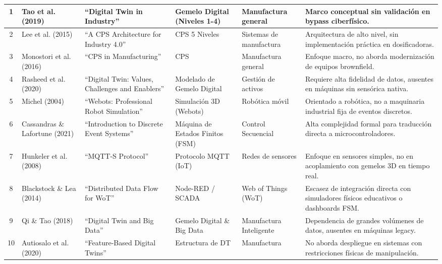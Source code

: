 {\begin{longtable}{|c|p{1.5cm}|p{3.2cm}|p{2.5cm}|p{2cm}|p{3cm}|}
1 & Tao et al. (2019) & ``Digital Twin in Industry'' \cite{tao2019} & Gemelo Digital (Niveles 1-4) & Manufactura general & Marco conceptual sin validación en bypass ciberfísico. \\ 
\hline
2 & Lee et al. (2015) & ``A CPS Architecture for Industry 4.0'' \cite{lee2015} & CPS 5 Niveles & Sistemas de manufactura & Arquitectura de alto nivel, sin implementación práctica en dosificadoras. \\
\hline
3 & Monostori et al. (2016) & ``CPS in Manufacturing'' \cite{monostori2016} & CPS & Manufactura general & Enfoque macro, no aborda modernización de equipos brownfield. \\
\hline
4 & Rasheed et al. (2020) & ``Digital Twin: Values, Challenges and Enablers'' \cite{rasheed2020} & Modelado de Gemelo Digital & Gestión de activos & Requiere alta fidelidad de datos, ausentes en máquinas sin sensórica nativa. \\
\hline
5 & Michel (2004) & ``Webots: Professional Robot Simulation'' \cite{michel2004} & Simulación 3D (Webots) & Robótica móvil & Orientado a robótica, no a maquinaria industrial fija de eventos discretos. \\
\hline
6 & Cassandras \& Lafortune (2021) & ``Introduction to Discrete Event Systems'' \cite{cassandras2021} & Máquina de Estados Finitos (FSM) & Control Secuencial & Alta complejidad formal para traducción directa a microcontroladores. \\
\hline
7 & Hunkeler et al. (2008) & ``MQTT-S Protocol'' \cite{hunkeler2008} & Protocolo MQTT (IoT) & Redes de sensores & Enfoque en sensores simples, no en acoplamiento con gemelos 3D en tiempo real. \\
\hline
8 & Blackstock \& Lea (2014) & ``Distributed Data Flow for WoT'' \cite{blackstock2014} & Node-RED / SCADA & Web of Things (WoT) & Escasez de integración directa con simuladores físicos educativos o dashboards FSM. \\
\hline
9 & Qi \& Tao (2018) & ``Digital Twin and Big Data'' \cite{qi2018} & Gemelo Digital \& Big Data & Manufactura Inteligente & Dependencia de grandes volúmenes de datos, ausentes en máquinas legacy. \\
\hline
10 & Autiosalo et al. (2020) & ``Feature-Based Digital Twins'' \cite{autiosalo2020} & Estructura de DT & Manufactura & No aborda despliegue en sistemas con restricciones físicas de manipulación. \\
\end{longtable}
}

